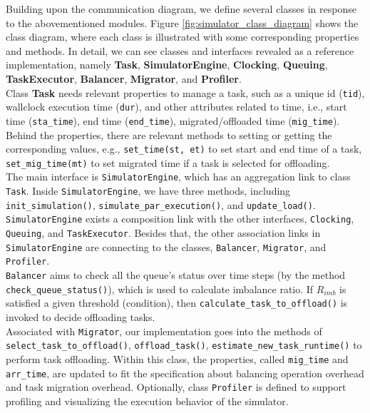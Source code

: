 Building upon the communication diagram, we define several classes in response to the abovementioned modules. Figure \ref{fig:simulator_class_diagram} shows the class diagram, where each class is illustrated with some corresponding properties and methods. In detail, we can see classes and interfaces revealed as a reference implementation, namely \textbf{Task}, \textbf{SimulatorEngine}, \textbf{Clocking}, \textbf{Queuing}, \textbf{TaskExecutor}, \textbf{Balancer}, \textbf{Migrator}, and \textbf{Profiler}.\\

Class \textbf{Task} needs relevant properties to manage a task, such as a unique id (\texttt{tid}), wallclock execution time (\texttt{dur}), and other attributes related to time, i.e., start time (\texttt{sta\_time}), end time (\texttt{end\_time}), migrated/offloaded time (\texttt{mig\_time}). Behind the properties, there are relevant methods to setting or getting the corresponding values, e.g., \texttt{set\_time(st, et)} to set start and end time of a task, \texttt{set\_mig\_time(mt)} to set migrated time if a task is selected for offloading.\\

The main interface is \texttt{SimulatorEngine}, which has an aggregation link to class \texttt{Task}. Inside \texttt{SimulatorEngine}, we have three methods, including \texttt{init\_simulation()}, \texttt{simulate\_par\_execution()}, and \texttt{update\_load()}. \texttt{SimulatorEngine} exists a composition link with the other interfaces, \texttt{Clocking}, \texttt{Queuing}, and \texttt{TaskExecutor}. Besides that, the other association links in \texttt{SimulatorEngine} are connecting to the classes, \texttt{Balancer}, \texttt{Migrator}, and \texttt{Profiler}.\\

\texttt{Balancer} aims to check all the queue's status over time steps (by the method \texttt{check\_queue\_status()}), which is used to calculate imbalance ratio. If $R_{imb}$ is satisfied a given threshold (condition), then \texttt{calculate\_task\_to\_offload()} is invoked to decide offloading tasks.\\

Associated with \texttt{Migrator}, our implementation goes into the methods of \texttt{select\_task\_to\_offload()}, \texttt{offload\_task()}, \texttt{estimate\_new\_task\_runtime()} to perform task offloading. Within this class, the properties, called \texttt{mig\_time} and \texttt{arr\_time}, are updated to fit the specification about balancing operation overhead and task migration overhead. Optionally, class \texttt{Profiler} is defined to support profiling and visualizing the execution behavior of the simulator.

